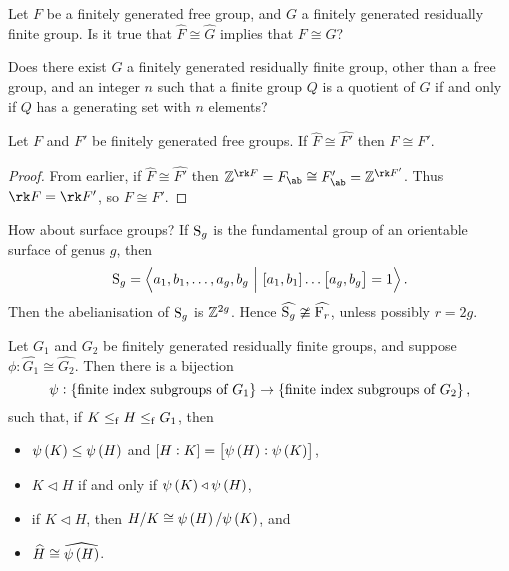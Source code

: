 \begin{question}
Let $ F $ be a finitely generated free group, and $ G $ a finitely generated residually finite group. Is it true that $ \widehat{F} \cong \widehat{G} $ implies that $ F \cong G $?
\end{question}

\begin{question}
Does there exist $ G $ a finitely generated residually finite group, other than a free group, and an integer $ n $ such that a finite group $ Q $ is a quotient of $ G $ if and only if $ Q $ has a generating set with $ n $ elements?
\end{question}

\pagebreak

\begin{proposition}
Let $ F $ and $ F' $ be finitely generated free groups. If $ \widehat{F} \cong \widehat{F'} $ then $ F \cong F' $.
\end{proposition}

\begin{proof}
From earlier, if $ \widehat{F} \cong \widehat{F'} $ then $ \ZZ^{\rk F} = F_{\ab} \cong F_{\ab}' = \ZZ^{\rk F'} $. Thus $ \rk F = \rk F' $, so $ F \cong F' $.
\end{proof}

How about surface groups? If $ \S_g $ is the fundamental group of an orientable surface of genus $ g $, then
$$ \S_g = \abr{a_1, b_1, \dots, a_g, b_g \st \sbr{a_1, b_1} \dots \sbr{a_g, b_g} = 1}. $$
Then the abelianisation of $ \S_g $ is $ \ZZ^{2g} $. Hence $ \widehat{\S_g} \ncong \widehat{\F_r} $, unless possibly $ r = 2g $.

\begin{theorem}
Let $ G_1 $ and $ G_2 $ be finitely generated residually finite groups, and suppose $ \phi : \widehat{G_1} \cong \widehat{G_2} $. Then there is a bijection
$$ \psi : \cbr{\text{finite index subgroups of} \ G_1} \to \cbr{\text{finite index subgroups of} \ G_2}, $$
such that, if $ K \le_\f H \le_\f G_1 $, then
\begin{itemize}
\item $ \psi\br{K} \le \psi\br{H} $ and $ \sbr{H : K} = \sbr{\psi\br{H} : \psi\br{K}} $,
\item $ K \triangleleft H $ if and only if $ \psi\br{K} \triangleleft \psi\br{H} $,
\item if $ K \triangleleft H $, then $ H / K \cong \psi\br{H} / \psi\br{K} $, and
\item $ \widehat{H} \cong \widehat{\psi\br{H}} $.
\end{itemize}
\end{theorem}

